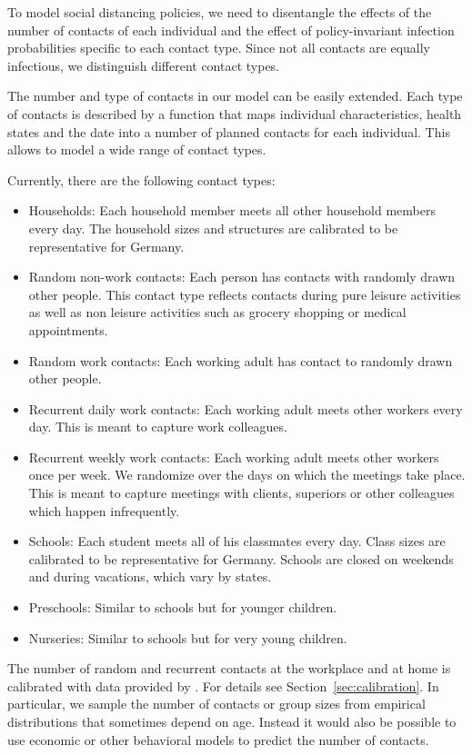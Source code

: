 To model social distancing policies, we need to disentangle the effects of the number of contacts of each individual and the effect of policy-invariant infection probabilities specific to each contact type. Since not all contacts are equally infectious, we distinguish different contact types.

The number and type of contacts in our model can be easily extended. Each type of contacts is described by a function that maps individual characteristics, health states and the date into a number of planned contacts for each individual. This allows to model a wide range of contact types.

Currently, there are the following contact types:

\begin{itemize}
    \item Households: Each household member meets all other household members every day. The household sizes and structures are calibrated to be representative for Germany.
    \item Random non-work contacts: Each person has contacts with randomly drawn other people. This contact type reflects contacts during pure leisure activities as well as non leisure activities such as grocery shopping or medical appointments.
    \item Random work contacts: Each working adult has contact to randomly drawn other people.
    \item Recurrent daily work contacts: Each working adult meets other workers every day. This is meant to capture work colleagues.
    \item Recurrent weekly work contacts: Each working adult meets other workers once per week. We randomize over the days on which the meetings take place. This is meant to capture meetings with clients, superiors or other colleagues which happen infrequently.
    \item Schools: Each student meets all of his classmates every day. Class sizes are calibrated to be representative for Germany. Schools are closed on weekends and during vacations, which vary by states.
    \item Preschools: Similar to schools but for younger children.
    \item Nurseries: Similar to schools but for very young children.
\end{itemize}


The number of random and recurrent contacts at the workplace and at home is calibrated with data provided by \cite{Mossong2008}. For details see Section~\ref{sec:calibration}. In particular, we sample the number of contacts or group sizes from empirical distributions that sometimes depend on age. Instead it would also be possible to use economic or other behavioral models to predict the number of contacts.

